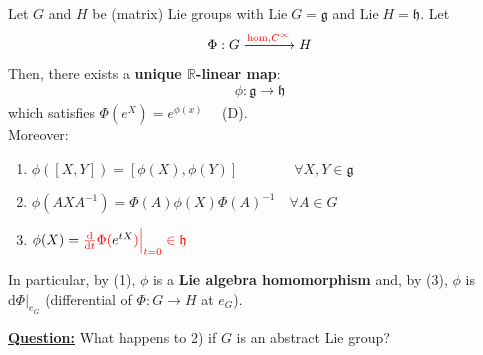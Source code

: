 \documentclass[../main.tex]{subfiles}
\begin{document}
\begin{theorem}
Let $G$ and $H$ be (matrix) Lie groups with $\textrm{Lie}\;G=\mathfrak{g}$ and $\textrm{Lie}\;H=\mathfrak{h}$. Let 
\[
\Phi:G\xrightarrow[]{{\color{red}\text{hom},C^{\infty}}}H
\]Then, there exists a \textbf{unique $\mathbb{R}$-linear map}:
\[
\phi:\mathfrak{g}\xrightarrow[]{}\mathfrak{h}
\]
which satisfies {\color{red}$\Phi( e^X)=e^{\phi(x)}\quad$ (D)}.\\ Moreover:
\renewcommand{\labelenumi}{\arabic{enumi})}
\begin{enumerate}
\item $\phi([X,Y])=[\phi(X),\phi(Y)] \qquad\qquad \forall X,Y\in\mathfrak{g}$
\item $\phi(AXA^{-1})=\Phi(A)\phi(X)\Phi(A)^{-1} \quad \forall A\in G$
\item $\phi(X)={\color{red}\dv{t}\Phi(}e^{tX}{\color{red})\Bigr|_{\substack{t=0}}\in\mathfrak{h}}$
\end{enumerate}
In particular, by (1), $\phi$ is a \textbf{Lie algebra homomorphism} and, by (3), $\phi$ is $\textrm{d}\Phi\big|_{e_G}$ (differential of $\Phi:G\to H$ at $e_G$).
\end{theorem}
\underline{\textbf{Question:}} What happens to 2) if $G$ is an abstract Lie group? 
\end{document}
